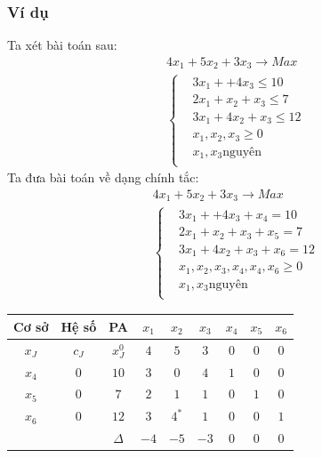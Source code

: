 \documentclass[12pt,a4paper]{report}
\begin{document}
 \subsubsection{Ví dụ}
 Ta xét bài toán sau:
 \begin{equation*}
        \begin{split}
         & 4x_1+5x_2+3x_3\longrightarrow Max \\
        & \left\{\begin{split}
            & 3x_1+   +4x_3 \le 10\\
            & 2x_1+x_2+x_3 \le 7\\
            & 3x_1+4x_2+x_3 \le 12\\
            & x_1,x_2,x_3 \ge 0\\
            & x_1,x_3 \text{nguyên}\\
        \end{split}\right.
    \end{split}
    \end{equation*}
    Ta đưa bài toán về dạng chính tắc:\\
    \begin{equation*}
        \begin{split}
         &4x_1+5x_2+3x_3 \longrightarrow Max \\
        & \left\{\begin{split}
            & 3x_1+  +4x_3+x_4=10\\
            &2x_1+x_2+x_3+x_5=7\\
            &3x_1+4x_2+x_3+  x_6=12\\
            & x_1,x_2,x_3,x_4,x_4,x_6 \ge 0\\
            & x_1,x_3 \text{nguyên}\\
        \end{split}\right.
    \end{split}
    \end{equation*}
    \begin{center}
        \begin{tabular}{|c|c|c|c|c|c|c|c|c|}
        \hline
         Cơ sở & Hệ số & PA& $x_1$ &$x_2$ &$x_3$ &$x_4$ &$x_5$ &$x_6$  \\
         \hline
          $x_J$& $c_J$ &$x_J^0$ &$4$ &$5$ &$ 3$ &$0$ &$0$ &$0$\\
          \hline
          $x_4$ &$0$ &$10$ &$3$ &$0$ &$4$ &$1$ &$0$ &$0$\\
          $x_5$ &$0$ &$7$ &$2$ &$1$ &$1$ &$0$ &$1$ &$0$\\
          $x_6$ &$0$ &$12$ &$3$ &$4^*$ &$1$ &$0$ &$0$ &$1$\\
          \hline
          &&$\Delta$ &$-4$ &$-5$ &$-3$ &$0$ &$0$ &$0$\\
          \hline
      \end{tabular}
    \end{center}    
\end{document}
